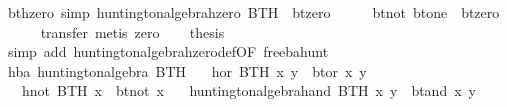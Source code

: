 \begin{isabellebody}
\isamarkupfalse%
%
\endisatagproof
{\isafoldproof}%
%
\isadelimproof
\isanewline
%
\endisadelimproof
\isanewline
{}\isamarkupfalse%
\ bt{}hzero\ {}simp{}{}\ {}huntington{}algebra{}hzero\ BTH\ {}\ bt{}zero{}\isanewline
%
\isadelimproof
%
\endisadelimproof
%
\isatagproof
{}\isamarkupfalse%
\ {}\isanewline
\ \ \isamarkupfalse%
\ {}bt{}not\ bt{}one\ {}\ bt{}zero{}\isanewline
\ \ \ \ \isamarkupfalse%
\ {}transfer{}\ metis\ zero{}\isanewline
\ \ \isamarkupfalse%
\ {}thesis\isanewline
\ \ \ \ \isamarkupfalse%
\ {}simp\ add{}\ huntington{}algebra{}hzero{}def{}OF\ free{}ba{}hunt{}{}\isanewline
{}\isamarkupfalse%
%
\endisatagproof
{\isafoldproof}%
%
\isadelimproof
\isanewline
%
\endisadelimproof
\isanewline
{}\isamarkupfalse%
\ hba{}\ huntington{}algebra\ {}BTH{}\isanewline
\ \ \ {}hor\ BTH\ x\ y\ {}\ bt{}or\ x\ y{}\isanewline
\ \ \ {}hnot\ BTH\ x\ {}\ bt{}not\ x{}\isanewline
\ \ \ {}huntington{}algebra{}hand\ BTH\ x\ y\ {}\ bt{}and\ x\ y{}\isanewline

\end{isabellebody}
